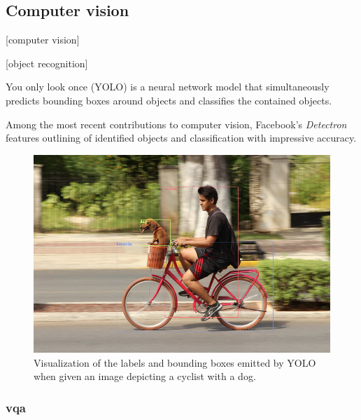 


\subsection{Computer vision}

[computer vision]

[object recognition]

You only look once (YOLO) \citep{RedmonYouOnlyLook2015} is a neural network model that simultaneously predicts bounding boxes around objects and classifies the contained objects.

Among the most recent contributions to computer vision, Facebook's \textit{Detectron} \citep{Detectron2018} features outlining of identified objects and classification with impressive accuracy.

\begin{figure}[h]
\label{fig:dogbike_annotated}
\includegraphics[width=\textwidth]{dogbike_annotated}
\centering
\caption{Visualization of the labels and bounding boxes emitted by YOLO when given an image depicting a cyclist with a dog.}
\end{figure}

\subsubsection{\Acrfull{vqa}}